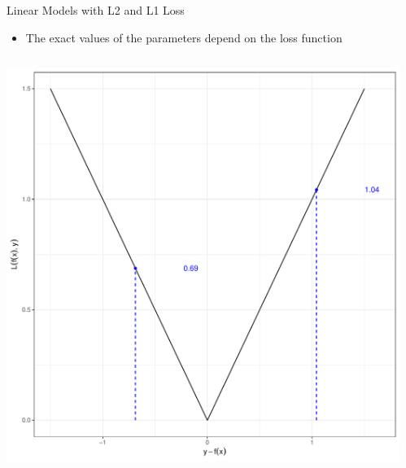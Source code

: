 \documentclass[11pt,compress,t,notes=noshow, xcolor=table]{beamer}
\begin{document}
\begin{vbframe}{Linear Models with L2 and L1 Loss}
\begin{itemize}
\item \small The exact values of the parameters depend on the loss function 
\end{itemize}
\begin{columns}  
\begin{column}{0.4\textwidth} 
\begin{center}
  \includegraphics[width = \textwidth]{slides/supervised-regression/figure/nutshell-regression-L1.pdf}
\end{center}
\end{column}
\begin{column}{0.4\textwidth} 
\begin{center}

\end{center}
\end{column}
\end{columns}
\end{vbframe}
\end{document}
